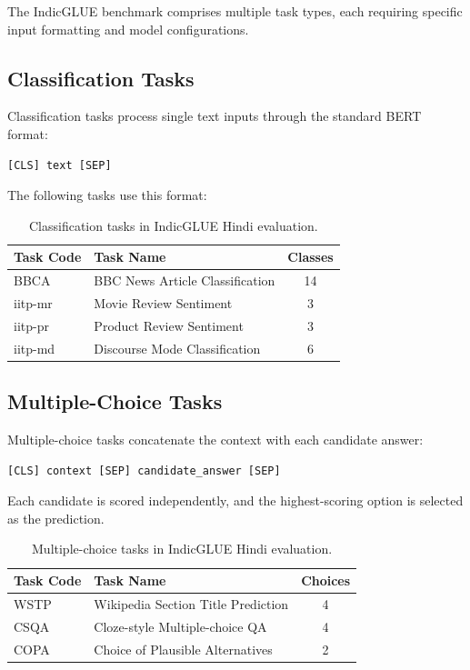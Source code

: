 The IndicGLUE benchmark comprises multiple task types, each requiring specific input formatting and model configurations.

\subsection{Classification Tasks}

Classification tasks process single text inputs through the standard BERT format:

\begin{verbatim}
[CLS] text [SEP]
\end{verbatim}

\noindent The following tasks use this format:

\begin{table}[h]
\centering
\begin{tabular}{llc}
\toprule
\textbf{Task Code} & \textbf{Task Name} & \textbf{Classes} \\
\midrule
BBCA & BBC News Article Classification & 14 \\
iitp-mr & Movie Review Sentiment & 3 \\
iitp-pr & Product Review Sentiment & 3 \\
iitp-md & Discourse Mode Classification & 6 \\
\bottomrule
\end{tabular}
\caption{Classification tasks in IndicGLUE Hindi evaluation.}
\label{tab:classification-tasks}
\end{table}

\subsection{Multiple-Choice Tasks}

Multiple-choice tasks concatenate the context with each candidate answer:

\begin{verbatim}
[CLS] context [SEP] candidate_answer [SEP]
\end{verbatim}

\noindent Each candidate is scored independently, and the highest-scoring option is selected as the prediction.

\begin{table}[h]
\centering
\begin{tabular}{llc}
\toprule
\textbf{Task Code} & \textbf{Task Name} & \textbf{Choices} \\
\midrule
WSTP & Wikipedia Section Title Prediction & 4 \\
CSQA & Cloze-style Multiple-choice QA & 4 \\
COPA & Choice of Plausible Alternatives & 2 \\
\bottomrule
\end{tabular}
\caption{Multiple-choice tasks in IndicGLUE Hindi evaluation.}
\label{tab:mc-tasks}
\end{table}


